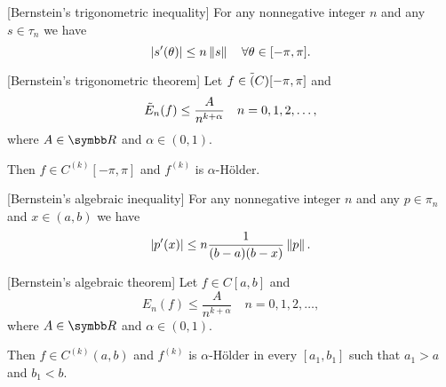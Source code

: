 \begin{theorem}\label{thm:bernsteins_trigonometric_inequality}[Bernstein's trigonometric inequality]\cite[53]{Николов2020}
  For any nonnegative integer \( n \) and any \( s \in \tau_n \) we have
  \begin{equation*}
    \left\vert s'(\theta) \right\vert \leq n \left\Vert s \right\Vert \quad\forall \theta \in [-\pi, \pi].
  \end{equation*}
\end{theorem}

\begin{theorem}\label{thm:bernsteins_trigonometric_theorem}[Bernstein's trigonometric theorem]\cite[55]{Николов2020}
  Let \( f \in \tilde{(}C)[-\pi, \pi] \) and
  \begin{equation*}
    \tilde{E}_n(f) \leq \frac A {n^{k+\alpha}} \quad n = 0, 1, 2, \ldots,
  \end{equation*}
  where \( A \in \BR \) and \( \alpha \in (0, 1) \).

  Then \( f \in C^{(k)}[-\pi, \pi] \) and \( f^{(k)} \) is \( \alpha \)-H\"older.
\end{theorem}

\begin{theorem}\label{thm:bernsteins_trigonometric_inequality}[Bernstein's algebraic inequality]\cite[59]{Николов2020}
  For any nonnegative integer \( n \) and any \( p \in \pi_n \) and \( x \in (a, b) \) we have
  \begin{equation*}
    \left\vert p'(x) \right\vert \leq n \frac 1 {(b - a)(b - x)} \left\Vert p \right\Vert.
  \end{equation*}
\end{theorem}

\begin{theorem}\label{thm:bernsteins_trigonometric_theorem}[Bernstein's algebraic theorem]\cite[60]{Николов2020}
  Let \( f \in C[a, b] \) and
  \begin{equation*}
    E_n(f) \leq \frac A {n^{k+\alpha}} \quad n = 0, 1, 2, \ldots,
  \end{equation*}
  where \( A \in \BR \) and \( \alpha \in (0, 1) \).

  Then \( f \in C^{(k)}(a, b) \) and \( f^{(k)} \) is \( \alpha \)-H\"older in every \( [a_1, b_1] \) such that \( a_1 > a \) and \( b_1 < b \).
\end{theorem}
